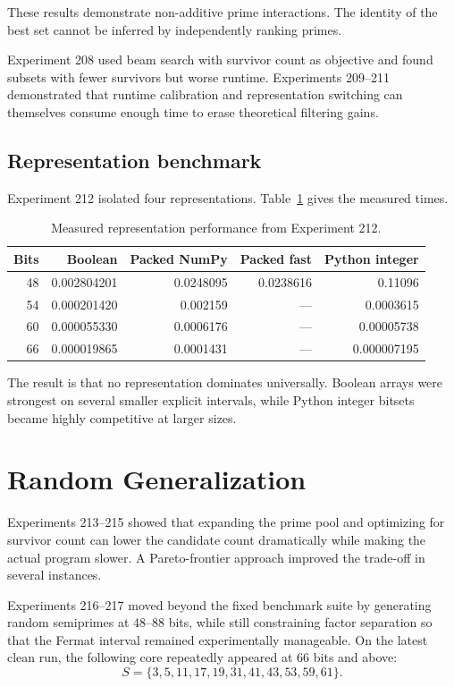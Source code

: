 \documentclass[11pt,a4paper]{article}
\begin{document}
These results demonstrate non-additive prime interactions. The identity of the best set cannot be inferred by independently ranking primes.

Experiment 208 used beam search with survivor count as objective and found subsets with fewer survivors but worse runtime. Experiments 209--211 demonstrated that runtime calibration and representation switching can themselves consume enough time to erase theoretical filtering gains.

\subsection{Representation benchmark}

Experiment 212 isolated four representations. Table~\ref{tab:representation} gives the measured times.

\begin{table}[H]
\centering
\caption{Measured representation performance from Experiment 212.}
\label{tab:representation}
\begin{tabular}{rrrrr}
\toprule
Bits & Boolean & Packed NumPy & Packed fast & Python integer\\
\midrule
48 & 0.002804201 & 0.0248095 & 0.0238616 & 0.11096\\
54 & 0.000201420 & 0.002159 & --- & 0.0003615\\
60 & 0.000055330 & 0.0006176 & --- & 0.00005738\\
66 & 0.000019865 & 0.0001431 & --- & 0.000007195\\
\bottomrule
\end{tabular}
\end{table}

The result is that no representation dominates universally. Boolean arrays were strongest on several smaller explicit intervals, while Python integer bitsets became highly competitive at larger sizes.

\section{Random Generalization}

Experiments 213--215 showed that expanding the prime pool and optimizing for survivor count can lower the candidate count dramatically while making the actual program slower. A Pareto-frontier approach improved the trade-off in several instances.

Experiments 216--217 moved beyond the fixed benchmark suite by generating random semiprimes at 48--88 bits, while still constraining factor separation so that the Fermat interval remained experimentally manageable. On the latest clean run, the following core repeatedly appeared at 66 bits and above:
\begin{equation}
 S=\{3,5,11,17,19,31,41,43,53,59,61\}.
\label{eq:core}
\end{equation}
\end{document}
